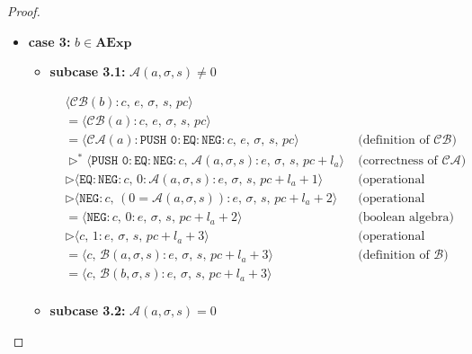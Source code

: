 \documentclass{article}
\begin{document}
\begin{proof}
\begin{itemize}
    
    \item \textbf{case 3: } $b \in \textbf{AExp}$

     \begin{itemize}
         \item \textbf{subcase 3.1: } $\mathcal{A}(a, \sigma, s) \neq 0$

         \[
          \begin{aligned}
            &\langle  \mathcal{CB}(b) : c,\, e,\, \sigma,\, s,\, pc \rangle \\
            &= \langle \mathcal{CB}(a) : c,\, e,\, \sigma,\, s,\, pc \rangle \\
            &= \langle \mathcal{CA}(a) : \texttt{PUSH 0} : \texttt{EQ} : \texttt{NEG} : c,\, e,\, \sigma,\, s,\, pc \rangle
            && \text{(definition of } \mathcal{CB}\text{)} \\
            &\triangleright^\ast \langle \texttt{PUSH 0} : \texttt{EQ} : \texttt{NEG} : c,\, \mathcal{A}(a, \sigma, s): e,\, \sigma,\, s,\, pc + l_a \rangle
            && \text{(correctness of } \mathcal{CA}\text{)} \\
            &\triangleright \langle \texttt{EQ} : \texttt{NEG} :  c,\, 0 : \mathcal{A}(a, \sigma, s): e,\, \sigma,\, s,\, pc + l_a + 1 \rangle
            && \text{(operational semantics)} \\
            &\triangleright \langle \texttt{NEG} : c,\, (0 = \mathcal{A}(a, \sigma, s)) : e,\, \sigma,\, s,\, pc + l_a + 2 \rangle
            && \text{(operational semantics)} \\
            &= \langle \texttt{NEG} : c,\, 0 : e,\, \sigma,\, s,\, pc + l_a + 2 \rangle
            && \text{(boolean algebra)} \\
            &\triangleright \langle c,\, 1 : e,\, \sigma,\, s,\, pc + l_a + 3 \rangle
            && \text{(operational semantics)} \\
            &= \langle c,\, \mathcal{B}(a, \sigma, s) : e,\, \sigma,\, s,\, pc + l_a + 3 \rangle
            && \text{(definition of } \mathcal{B}\text{)} \\
            &= \langle c,\, \mathcal{B}(b, \sigma, s) : e,\, \sigma,\, s,\, pc + l_a + 3 \rangle
            \\
          \end{aligned}
      \]

         \item \textbf{subcase 3.2: } $\mathcal{A}(a, \sigma, s) = 0$


\end{itemize}
\end{itemize}
\end{proof}
\end{document}
